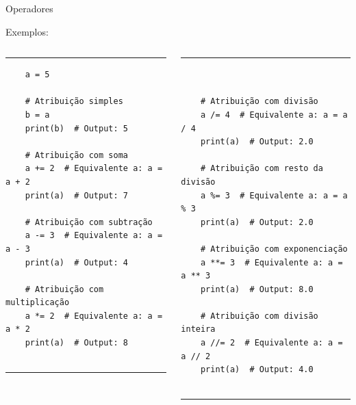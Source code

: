 \documentclass{beamer}
\begin{document}
\begin{frame}[fragile]{Operadores}
	
	\label{operadores_atribuicao_exemplo}
	Exemplos:
	
	\begin{columns}
		\begin{column}{0.5\textwidth}
			
			\rule{\textwidth}{1pt}
			\scriptsize
			\begin{verbatim}
	a = 5
	
	# Atribuição simples
	b = a
	print(b)  # Output: 5
	
	# Atribuição com soma
	a += 2  # Equivalente a: a = a + 2
	print(a)  # Output: 7
	
	# Atribuição com subtração
	a -= 3  # Equivalente a: a = a - 3
	print(a)  # Output: 4
	
	# Atribuição com multiplicação
	a *= 2  # Equivalente a: a = a * 2
	print(a)  # Output: 8
	
			\end{verbatim}
			\rule{\textwidth}{1pt}
		\end{column}
		\begin{column}{0.5\textwidth}
			
			\rule{\textwidth}{1pt}
			\scriptsize
			\begin{verbatim}
				
				
	# Atribuição com divisão
	a /= 4  # Equivalente a: a = a / 4
	print(a)  # Output: 2.0
	
	# Atribuição com resto da divisão
	a %= 3  # Equivalente a: a = a % 3
	print(a)  # Output: 2.0
	
	# Atribuição com exponenciação
	a **= 3  # Equivalente a: a = a ** 3
	print(a)  # Output: 8.0
	
	# Atribuição com divisão inteira
	a //= 2  # Equivalente a: a = a // 2
	print(a)  # Output: 4.0
				
			\end{verbatim}
			
			\rule{\textwidth}{1pt}
		\end{column}
	\end{columns}
	
\end{frame}
\end{document}
